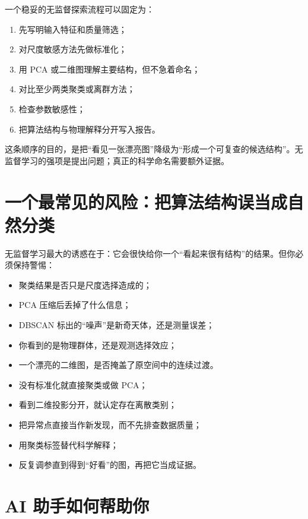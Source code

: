 一个稳妥的无监督探索流程可以固定为：

\begin{enumerate}
    \item 先写明输入特征和质量筛选；
    \item 对尺度敏感方法先做标准化；
    \item 用 PCA 或二维图理解主要结构，但不急着命名；
    \item 对比至少两类聚类或离群方法；
    \item 检查参数敏感性；
    \item 把算法结构与物理解释分开写入报告。
\end{enumerate}

这条顺序的目的，是把“看见一张漂亮图”降级为“形成一个可复查的候选结构”。无监督学习的强项是提出问题；真正的科学命名需要额外证据。

\section{一个最常见的风险：把算法结构误当成自然分类}

无监督学习最大的诱惑在于：它会很快给你一个“看起来很有结构”的结果。但你必须保持警惕：

\begin{itemize}
    \item 聚类结果是否只是尺度选择造成的；
    \item PCA 压缩后丢掉了什么信息；
    \item DBSCAN 标出的“噪声”是新奇天体，还是测量误差；
    \item 你看到的是物理群体，还是观测选择效应；
    \item 一个漂亮的二维图，是否掩盖了原空间中的连续过渡。
\end{itemize}

\begin{warnbox}[无监督学习中的常见误区]
\begin{itemize}
    \item 没有标准化就直接聚类或做 PCA；
    \item 看到二维投影分开，就认定存在离散类别；
    \item 把异常点直接当作新发现，而不先排查数据质量；
    \item 用聚类标签替代科学解释；
    \item 反复调参直到得到“好看”的图，再把它当成证据。
\end{itemize}
\end{warnbox}

\section{AI 助手如何帮助你}

